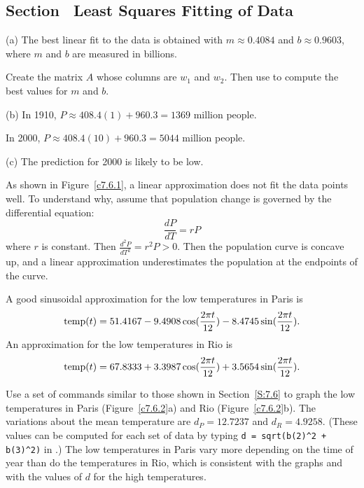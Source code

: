 \documentclass{ximera}
\begin{document}
\newpage
\subsection*{Section~\protect{\ref{S:7.6}} Least Squares Fitting of Data}

(a) \ans The best linear fit to the data is obtained with $m \approx
0.4084$ and $b \approx 0.9603$, where $m$ and $b$ are measured in
billions.

\soln Create the matrix $A$ whose columns are $w_1$ and $w_2$.  Then use
 to compute the best values for $m$ and $b$.

(b) In 1910, $P \approx 408.4(1) + 960.3 = 1369$ million people.

\para In 2000, $P \approx 408.4(10) + 960.3 = 5044$ million people.

(c) \ans The prediction for 2000 is likely to be low.

\soln As shown in Figure~\ref{c7.6.1}, a linear approximation does not
fit the data points well.  To understand why, assume that population
change is governed by the differential equation:
\[
\frac{dP}{dT} = rP
\]
where $r$ is constant.  Then $\frac{d^2P}{dT^2} = r^2P > 0$.
Then the population curve is concave up, and a linear approximation
underestimates the population at the endpoints of the curve.

\begin{figure}[htb]
		\centerline{%
		}
\end{figure}

\ans A good sinusoidal approximation for the low temperatures in Paris
is 
\[ \hbox{temp}(t) = 51.4167 - 9.4908\cos(\frac{2\pi t}{12}) -
8.4745\sin(\frac{2\pi t}{12}). \]
An approximation for the low temperatures in Rio is
\[ \hbox{temp}(t) = 67.8333 + 3.3987\cos(\frac{2\pi t}{12}) +
3.5654\sin(\frac{2\pi t}{12}). \]

\soln Use a set of \Matlab commands similar to those shown in
Section~\ref{S:7.6} to graph the low temperatures in Paris
(Figure~\ref{c7.6.2}a) and Rio (Figure~\ref{c7.6.2}b).  The
variations about the mean temperature are $d_P = 12.7237$ and
$d_R = 4.9258$.  (These values can be computed for each set of data
by typing {\tt d = sqrt(b(2)\^{}2 + b(3)\^{}2)} in \Matlabp.) 
The low temperatures in Paris vary more depending on the time of
year than do the temperatures in Rio, which is consistent with
the graphs and with the values of $d$ for the high temperatures.
\end{document}
